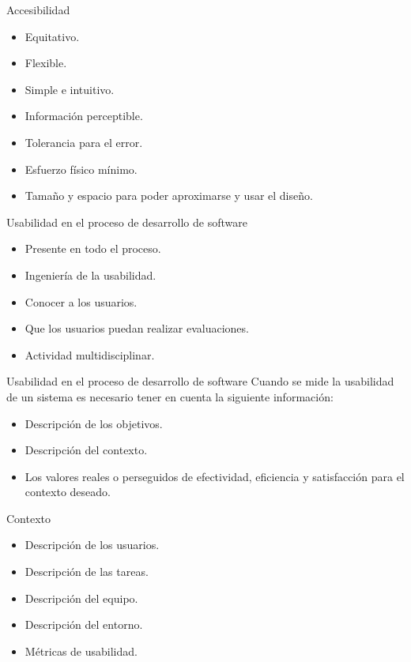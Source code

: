 \documentclass{beamer}
\begin{document}
\begin{frame}{Accesibilidad}
 \begin{itemize}
  \item Equitativo.
  \item Flexible.
  \item Simple e intuitivo.
  \item Información perceptible.
  \item Tolerancia para el error.
  \item Esfuerzo físico mínimo.
  \item Tamaño y espacio para poder aproximarse y usar el diseño.
 \end{itemize}
\end{frame}

\begin{frame}{Usabilidad en el proceso de desarrollo de software}
  \begin{itemize}
   \item Presente en todo el proceso.
   \item Ingeniería de la usabilidad.
   \item Conocer a los usuarios.
   \item Que los usuarios puedan realizar evaluaciones.
   \item Actividad multidisciplinar.
  \end{itemize}
\end{frame}

\begin{frame}{Usabilidad en el proceso de desarrollo de software}
 Cuando se mide la usabilidad de un sistema es necesario tener en cuenta la siguiente información:
 \begin{itemize}
  \item Descripción de los objetivos.
  \item Descripción del contexto.
  \item Los valores reales o perseguidos de efectividad, eficiencia y satisfacción para el contexto deseado.
 \end{itemize}
\end{frame}

\begin{frame}{Contexto}
 \begin{itemize}
  \item Descripción de los usuarios.
  \item Descripción de las tareas.
  \item Descripción del equipo.
  \item Descripción del entorno.
  \item Métricas de usabilidad.
 \end{itemize}
\end{frame}
\end{document}
